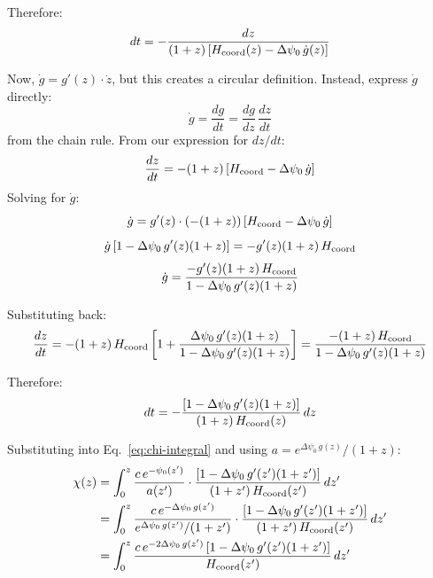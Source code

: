 \documentclass[11pt,a4paper]{article}
\begin{document}
Therefore:
\begin{equation}
dt = -\frac{dz}{(1+z)\left[H_{\rm coord}(z) - \Delta\psi_0\,\dot{g}(z)\right]}
\end{equation}

Now, $\dot{g} = g'(z) \cdot \dot{z}$, but this creates a circular
definition. Instead, express $\dot{g}$ directly:
\begin{equation}
\dot{g} = \frac{dg}{dt} = \frac{dg}{dz}\,\frac{dz}{dt}
\end{equation}
from the chain rule. From our expression for $dz/dt$:
\begin{equation}
\frac{dz}{dt} = -(1+z)\left[H_{\rm coord} - \Delta\psi_0\,\dot{g}\right]
\end{equation}
Solving for $\dot{g}$:
\begin{equation}
\dot{g} = g'(z) \cdot (-(1+z))\left[H_{\rm coord} - \Delta\psi_0\,\dot{g}\right]
\end{equation}
\begin{equation}
\dot{g}\left[1 - \Delta\psi_0\,g'(z)(1+z)\right] = -g'(z)(1+z)\,H_{\rm coord}
\end{equation}
\begin{equation}
\dot{g} = \frac{-g'(z)(1+z)\,H_{\rm coord}}{1 - \Delta\psi_0\,g'(z)(1+z)}
\end{equation}

Substituting back:
\begin{equation}
\frac{dz}{dt} = -(1+z)\,H_{\rm coord}\left[1 + \frac{\Delta\psi_0\,g'(z)(1+z)}
{1 - \Delta\psi_0\,g'(z)(1+z)}\right]
= \frac{-(1+z)\,H_{\rm coord}}{1 - \Delta\psi_0\,g'(z)(1+z)}
\end{equation}

Therefore:
\begin{equation}
dt = -\frac{[1 - \Delta\psi_0\,g'(z)(1+z)]}{(1+z)\,H_{\rm coord}(z)}\,dz
\end{equation}

Substituting into Eq.~\eqref{eq:chi-integral} and using
$a = e^{\Delta\psi_0\,g(z)}/(1+z)$:
\begin{align}
\chi(z) &= \int_0^z \frac{c\,e^{-\psi_0(z')}}{a(z')}
\cdot \frac{[1 - \Delta\psi_0\,g'(z')(1+z')]}{(1+z')\,H_{\rm coord}(z')}\,dz'
\nonumber\\
&= \int_0^z \frac{c\,e^{-\Delta\psi_0\,g(z')}}{e^{\Delta\psi_0\,g(z')}/(1+z')}
\cdot \frac{[1 - \Delta\psi_0\,g'(z')(1+z')]}{(1+z')\,H_{\rm coord}(z')}\,dz'
\nonumber\\
&= \int_0^z \frac{c\,e^{-2\Delta\psi_0\,g(z')}
\,[1 - \Delta\psi_0\,g'(z')(1+z')]}{H_{\rm coord}(z')}\,dz'
\label{eq:chi-full}
\end{align}
\end{document}
